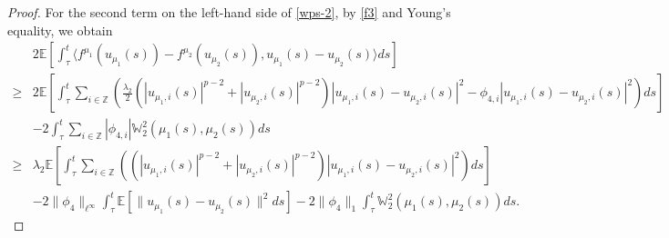 \documentclass[11pt]{article}
\numberwithin{equation}{section}
\theoremstyle{plain}
\begin{document}
\begin{proof}
 For the second term on the left-hand side of \eqref{wps-2},
 by \eqref{f3} and Young's equality, we obtain
 \begin{align} \label{wps-3}
        & 2 \mathbb{E}
               \left[ \int_{\tau}^{t}
                         \langle f^{\mu_1} (u_{\mu_1}(s)) - f^{\mu_2} (u_{\mu_2}(s)),
                                 u_{\mu_1}(s) - u_{\mu_2}(s)
                        \rangle ds
               \right]  \nonumber \\
  \ge & 2 \mathbb{E}
              \left[ \int_{\tau}^{t} \sum_{i \in \mathbb{Z}}
                        \left( \frac{\lambda_2}{2}
                                \left( |u_{\mu_1,i}(s)|^{p-2} + |u_{\mu_2,i}(s)|^{p-2} \right)
                                | u_{\mu_1,i}(s) - u_{\mu_2,i}(s) |^2
                                - \phi_{4,i} | u_{\mu_1,i}(s) - u_{\mu_2,i}(s) |^2
                        \right) ds
              \right]  \nonumber \\
       & - 2 \int_{\tau}^{t} \sum_{i \in \mathbb{Z}}
                             |\phi_{4,i}| \mathbb{W}^2_2(\mu_1(s), \mu_2(s))
                          ds  \nonumber \\
  \ge & \lambda_2
           \mathbb{E}
              \left[ \int_{\tau}^{t} \sum_{i \in \mathbb{Z}}
                        \left( \left( |u_{\mu_1,i}(s)|^{p-2} + |u_{\mu_2,i}(s)|^{p-2} \right)
                                | u_{\mu_1,i}(s) - u_{\mu_2,i}(s) |^2
                        \right) ds
              \right]  \nonumber \\
       & - 2 \|\phi_4\|_{\ell^\infty} \int_{\tau}^{t}
               \mathbb{E}
                  \left[ \| u_{\mu_1}(s) - u_{\mu_2}(s) \|^2 ds
                  \right]
         - 2 \|\phi_4\|_1 \int_{\tau}^{t}
               \mathbb{W}^2_2(\mu_1(s), \mu_2(s)) ds.
 \end{align}


\end{proof}
\end{document}
